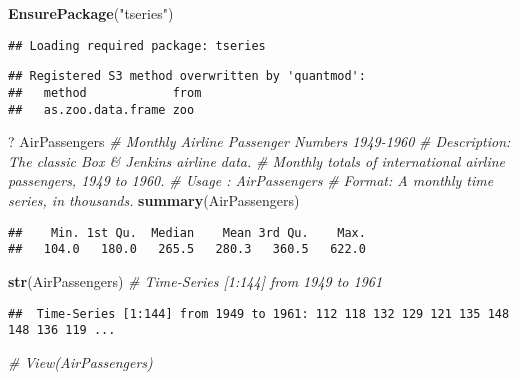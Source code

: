 \documentclass[]{article}
\newenvironment{Shaded}{\begin{snugshade}}{\end{snugshade}}
\newcommand{\CommentTok}[1]{\textcolor[rgb]{0.56,0.35,0.01}{\textit{#1}}}
\newcommand{\KeywordTok}[1]{\textcolor[rgb]{0.13,0.29,0.53}{\textbf{#1}}}
\newcommand{\NormalTok}[1]{#1}
\newcommand{\StringTok}[1]{\textcolor[rgb]{0.31,0.60,0.02}{#1}}
\begin{document}
\begin{Shaded}
\begin{Highlighting}[]
\KeywordTok{EnsurePackage}\NormalTok{(}\StringTok{"tseries"}\NormalTok{)}
\end{Highlighting}
\end{Shaded}

\begin{verbatim}
## Loading required package: tseries
\end{verbatim}

\begin{verbatim}
## Registered S3 method overwritten by 'quantmod':
##   method            from
##   as.zoo.data.frame zoo
\end{verbatim}

\begin{Shaded}
\begin{Highlighting}[]
\NormalTok{? AirPassengers}
\CommentTok{# Monthly Airline Passenger Numbers 1949-1960}
\CommentTok{# Description: The classic Box & Jenkins airline data. }
\CommentTok{# Monthly totals of international airline passengers, 1949 to 1960.}
\CommentTok{# Usage : AirPassengers}
\CommentTok{# Format: A monthly time series, in thousands.}
\KeywordTok{summary}\NormalTok{(AirPassengers)}
\end{Highlighting}
\end{Shaded}

\begin{verbatim}
##    Min. 1st Qu.  Median    Mean 3rd Qu.    Max. 
##   104.0   180.0   265.5   280.3   360.5   622.0
\end{verbatim}

\begin{Shaded}
\begin{Highlighting}[]
\KeywordTok{str}\NormalTok{(AirPassengers) }\CommentTok{# Time-Series [1:144] from 1949 to 1961}
\end{Highlighting}
\end{Shaded}

\begin{verbatim}
##  Time-Series [1:144] from 1949 to 1961: 112 118 132 129 121 135 148 148 136 119 ...
\end{verbatim}

\begin{Shaded}
\begin{Highlighting}[]
\CommentTok{# View(AirPassengers)}
\end{Highlighting}
\end{Shaded}
\end{document}
